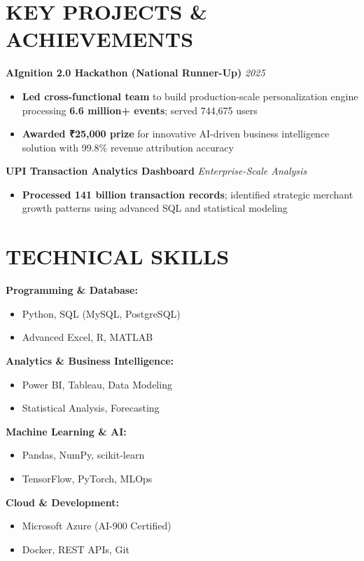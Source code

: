 \documentclass[letterpaper,11pt]{article}
\begin{document}
\vspace{2pt}

\section*{KEY PROJECTS \& ACHIEVEMENTS}
\textbf{AIgnition 2.0 Hackathon (National Runner-Up)} \hfill \textit{2025}
\begin{itemize}
  \item \textbf{Led cross-functional team} to build production-scale personalization engine processing \textbf{6.6 million+ events}; served 744,675 users
  \item \textbf{Awarded ₹25,000 prize} for innovative AI-driven business intelligence solution with 99.8\% revenue attribution accuracy
\end{itemize}

\textbf{UPI Transaction Analytics Dashboard} \hfill \textit{Enterprise-Scale Analysis}
\begin{itemize}
  \item \textbf{Processed 141 billion transaction records}; identified strategic merchant growth patterns using advanced SQL and statistical modeling
\end{itemize}

\vspace{2pt}

\section*{TECHNICAL SKILLS}
\begin{multicols}{2}
\textbf{Programming \& Database:}
\begin{itemize}
  \item Python, SQL (MySQL, PostgreSQL)
  \item Advanced Excel, R, MATLAB
\end{itemize}

\textbf{Analytics \& Business Intelligence:}
\begin{itemize}
  \item Power BI, Tableau, Data Modeling
  \item Statistical Analysis, Forecasting
\end{itemize}

\textbf{Machine Learning \& AI:}
\begin{itemize}
  \item Pandas, NumPy, scikit-learn
  \item TensorFlow, PyTorch, MLOps
\end{itemize}

\textbf{Cloud \& Development:}
\begin{itemize}
  \item Microsoft Azure (AI-900 Certified)
  \item Docker, REST APIs, Git
\end{itemize}
\end{multicols}
\end{document}

